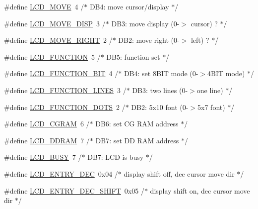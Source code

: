 \begin{DoxyCompactItemize}
\#define \hyperlink{group__pfleury__lcd_ga3f4f758b80fcfa6c9e4db58e2515c78a}{L\+C\+D\+\_\+\+M\+O\+VE}~4      /$\ast$ D\+B4\+: move cursor/display            $\ast$/
\item 
\#define \hyperlink{group__pfleury__lcd_gaaddc2afa9a02bfa748950f2c1e6a204d}{L\+C\+D\+\_\+\+M\+O\+V\+E\+\_\+\+D\+I\+SP}~3      /$\ast$   D\+B3\+: move display (0-\/$>$ cursor) ?  $\ast$/
\item 
\#define \hyperlink{group__pfleury__lcd_ga97cdb19acf109ad52ab4994d2ad02cee}{L\+C\+D\+\_\+\+M\+O\+V\+E\+\_\+\+R\+I\+G\+HT}~2      /$\ast$   D\+B2\+: move right (0-\/$>$ left) ?      $\ast$/
\item 
\#define \hyperlink{group__pfleury__lcd_ga50de1697f1da8ab075a6b4d7aeace64e}{L\+C\+D\+\_\+\+F\+U\+N\+C\+T\+I\+ON}~5      /$\ast$ D\+B5\+: function set                   $\ast$/
\item 
\#define \hyperlink{group__pfleury__lcd_ga91d15d8e3008f6cb141406a8b5d0d3c0}{L\+C\+D\+\_\+\+F\+U\+N\+C\+T\+I\+O\+N\+\_\+B\+IT}~4      /$\ast$   D\+B4\+: set 8\+B\+I\+T mode (0-\/$>$4\+B\+I\+T mode) $\ast$/
\item 
\#define \hyperlink{group__pfleury__lcd_ga6c24806bed18d565917165caa3475463}{L\+C\+D\+\_\+\+F\+U\+N\+C\+T\+I\+O\+N\+\_\+L\+I\+N\+ES}~3      /$\ast$   D\+B3\+: two lines (0-\/$>$one line)      $\ast$/
\item 
\#define \hyperlink{group__pfleury__lcd_ga48de81358277fe4f2810c2b82f90397e}{L\+C\+D\+\_\+\+F\+U\+N\+C\+T\+I\+O\+N\+\_\+D\+O\+TS}~2      /$\ast$   D\+B2\+: 5x10 font (0-\/$>$5x7 font)      $\ast$/
\item 
\#define \hyperlink{group__pfleury__lcd_ga3b38de74c362be1781fef1136aa9684c}{L\+C\+D\+\_\+\+C\+G\+R\+AM}~6      /$\ast$ D\+B6\+: set CG R\+AM address             $\ast$/
\item 
\#define \hyperlink{group__pfleury__lcd_gae54acf3ccc45b7d6be334a03627740c6}{L\+C\+D\+\_\+\+D\+D\+R\+AM}~7      /$\ast$ D\+B7\+: set DD R\+AM address             $\ast$/
\item 
\#define \hyperlink{group__pfleury__lcd_gac8dd1658e235f174d1cabae5c438943d}{L\+C\+D\+\_\+\+B\+U\+SY}~7      /$\ast$ D\+B7\+: L\+CD is busy                    $\ast$/
\item 
\#define \hyperlink{group__pfleury__lcd_gaad56f8e07634e85663f56888ae97089c}{L\+C\+D\+\_\+\+E\+N\+T\+R\+Y\+\_\+\+D\+EC}~0x04   /$\ast$ display shift off, dec cursor move dir $\ast$/
\item 
\#define \hyperlink{group__pfleury__lcd_ga1c62932f252c6262cbef728add9696e4}{L\+C\+D\+\_\+\+E\+N\+T\+R\+Y\+\_\+\+D\+E\+C\+\_\+\+S\+H\+I\+FT}~0x05   /$\ast$ display shift on,  dec cursor move dir $\ast$/

\end{DoxyCompactItemize}
